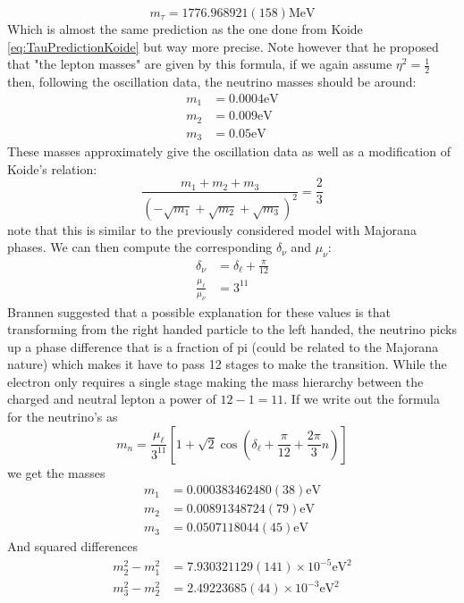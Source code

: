 \documentclass[twoside,twocolumn,11pt]{article} %
\begin{document}
\begin{equation}
	m_\tau = 1776.968921(158)\text{MeV}
\end{equation}
Which is almost the same prediction as the one done from Koide \ref{eq:TauPredictionKoide} but way more precise.
Note however that he proposed that "the lepton masses" are given by this formula, if we again assume $\eta^2 = \frac{1}{2}$ then, following the oscillation data, the neutrino masses should be around:
\begin{align}
	m_1&=0.0004\text{eV}\\
	m_2 &= 0.009\text{eV}\\
	m_3 &= 0.05\text{eV}
\end{align}
These masses approximately give the oscillation data as well as a modification of Koide's relation:
\begin{equation}
	\frac{m_1 + m_2 + m_3}{(-\sqrt{m_1} + \sqrt{m_2} + \sqrt{m_3})^2} = \frac{2}{3}
\end{equation}
note that this is similar to the previously considered model with Majorana phases. We can then compute the corresponding $\delta_\nu$ and $\mu_\nu$:
\begin{align}
	\delta_\nu &= \delta_\ell + \frac{\pi}{12}\\
	\frac{\mu_\ell}{\mu_\nu} &= 3^{11}
\end{align}
Brannen suggested that a possible explanation for these values is that transforming from the right handed particle to the left handed, the neutrino picks up a phase difference that is a fraction of pi (could be related to the Majorana nature) which makes it have to pass 12 stages to make the transition. While the electron only requires a single stage making the mass hierarchy between the charged and neutral lepton a power of $12-1=11$. If we write out the formula for the neutrino's as
\begin{equation}
	m_n = \frac{\mu_\ell}{3^{11}}\left[1 + \sqrt{2}\cos(\delta_\ell + \frac{\pi}{12} + \frac{2\pi}{3}n)\right]
\end{equation}
we get the masses
\begin{align}
	m_1 &= 0.000383462480(38)\text{eV}\\
	m_2 &= 0.00891348724(79)\text{eV}\\
	m_3 &= 0.0507118044(45)\text{eV}
\end{align}
And squared differences 
\begin{align}
	m_2^2 - m_1^2 &= 7.930321129(141)\times 10^{-5}\text{eV}^2\\
	m_3^2 - m_2^2 &= 2.49223685(44)\times 10^{-3} \text{eV}^2
\end{align}
\end{document}
